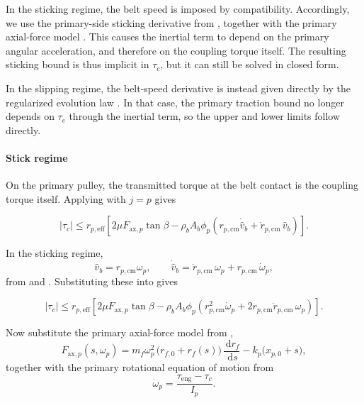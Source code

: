 \documentclass[11pt]{article}
\numberwithin{equation}{section}
\newcommand{\dd}{\,\mathrm{d}}
\begin{document}
In the sticking regime, the belt speed is imposed by compatibility.
Accordingly, we use the primary-side sticking derivative from
, together with the primary axial-force model
.
This causes the inertial term to depend on the primary angular acceleration,
and therefore on the coupling torque itself.
The resulting sticking bound is thus implicit in \(\tau_c\), but it can still
be solved in closed form.

In the slipping regime, the belt-speed derivative is instead given directly by
the regularized evolution law .
In that case, the primary traction bound no longer depends on \(\tau_c\)
through the inertial term, so the upper and lower limits follow directly.

\paragraph{Stick regime}

On the primary pulley, the transmitted torque at the belt contact is the
coupling torque itself.
Applying  with \(j=p\) gives

\begin{equation}
|\tau_c|
\le
r_{p,\mathrm{eff}}
\left[
2\mu F_{\mathrm{ax},p}\tan\beta
-
\rho_b A_b \phi_p
\left(
r_{p,\mathrm{cm}}\dot{\hat v}_b
+
\dot r_{p,\mathrm{cm}}\,\hat v_b
\right)
\right].
\label{eq:tau_p_capacity_stick_start}
\end{equation}

In the sticking regime,
\[
\hat v_b = r_{p,\mathrm{cm}}\omega_p,
\qquad
\dot{\hat v}_b
=
\dot r_{p,\mathrm{cm}}\,\omega_p
+
r_{p,\mathrm{cm}}\,\dot\omega_p,
\]
from  and .
Substituting these into  gives

\begin{equation}
|\tau_c|
\le
r_{p,\mathrm{eff}}
\left[
2\mu F_{\mathrm{ax},p}\tan\beta
-
\rho_b A_b \phi_p
\left(
r_{p,\mathrm{cm}}^2\dot\omega_p
+
2r_{p,\mathrm{cm}}\dot r_{p,\mathrm{cm}}\,\omega_p
\right)
\right].
\label{eq:tau_p_capacity_stick_mid}
\end{equation}

Now substitute the primary axial-force model from ,
\begin{equation}
F_{\mathrm{ax},p}(s,\omega_p)
=
m_f\omega_p^2\,\big(r_{f,0}+r_f(s)\big)\,\frac{\dd r_f}{\dd s}
-
k_p\bigl(x_{p,0}+s\bigr),
\label{eq:Fax_p_sub_stick}
\end{equation}
together with the primary rotational equation of motion from 
\begin{equation}
\dot\omega_p
=
\frac{\tau_{\mathrm{eng}}-\tau_c}{I_p}.
\label{eq:omega_p_dot_sub_stick}
\end{equation}
\end{document}
